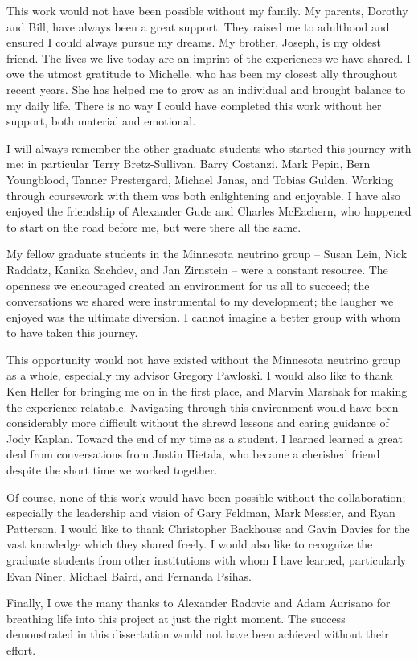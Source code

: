 This work would not have been possible without my family.
My parents, Dorothy and Bill, have always been a great support.
They raised me to adulthood and ensured I could always pursue
my dreams.
My brother, Joseph, is my oldest friend.
The lives we live today are an imprint of the experiences we have shared.
I owe the utmost gratitude to Michelle, who has been my closest ally
throughout recent years.
She has helped me to grow as an individual and brought balance
to my daily life.
There is no way I could have completed this work without her support,
both material and emotional.


I will always remember the other graduate students who
started this journey with me; in particular
Terry Bretz-Sullivan, Barry Costanzi, Mark Pepin, Bern Youngblood,
Tanner Prestergard, Michael Janas, and Tobias Gulden.
Working through coursework with them was both enlightening and
enjoyable.
I have also enjoyed the friendship of Alexander Gude and Charles McEachern,
who happened to start on the road before me, but were there all the same.

My fellow graduate students in the Minnesota neutrino group --
Susan Lein, Nick Raddatz, Kanika Sachdev, and Jan Zirnstein  --
were a constant resource.
The openness we encouraged created an environment for us all to succeed;
the conversations we shared were instrumental to my development;
the laugher we enjoyed was the ultimate diversion.
I cannot imagine a better group with whom to have taken this journey.

This opportunity would not have existed without the Minnesota neutrino group
as a whole, especially my advisor Gregory Pawloski.
I would also like to thank Ken Heller for bringing me on in the first place,
and Marvin Marshak for making the experience relatable.
Navigating through this environment would have been considerably more
difficult without the shrewd lessons and caring guidance of Jody Kaplan.
Toward the end of my time as a student, I learned learned a great deal from
conversations from Justin Hietala, who became a cherished friend despite the
short time we worked together.

Of course, none of this work would have been possible without the \nova
collaboration; especially the leadership and vision of Gary Feldman,
Mark Messier, and Ryan Patterson.
I would like to thank Christopher Backhouse and Gavin Davies
for the vast knowledge which they shared freely.
I would also like to recognize the graduate students from
other institutions with whom I have learned, particularly
Evan Niner, Michael Baird, and Fernanda Psihas.

Finally, I owe the many thanks to Alexander Radovic and Adam Aurisano
for breathing life into this project at just the right moment.
The success demonstrated in this dissertation
would not have been achieved without their effort.

